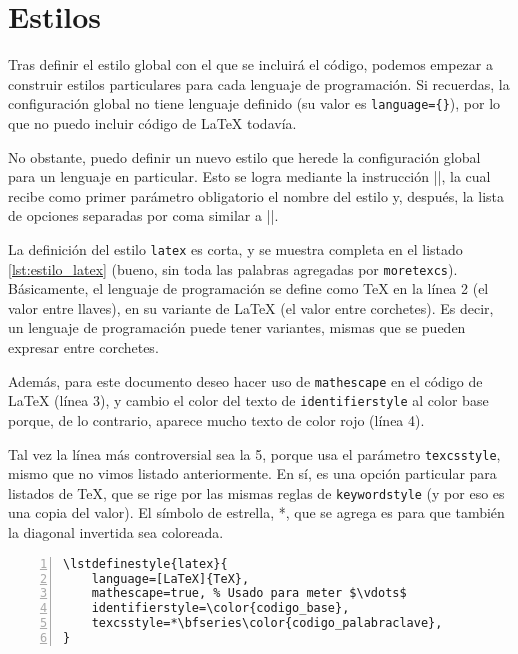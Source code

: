 \section{Estilos}
\label{sec:estilos_listing}



Tras definir el estilo global con el que se incluirá el código, podemos empezar a construir estilos particulares para cada lenguaje de programación. Si recuerdas, la configuración global no tiene lenguaje definido (su valor es \texttt{language=\{\}}), por lo que no puedo incluir código de \LaTeX{} todavía.

No obstante, puedo definir un nuevo estilo que herede la configuración global para un lenguaje en particular. Esto se logra mediante la instrucción |\lstdefinestyle|, la cual recibe como primer parámetro obligatorio el nombre del estilo y, después, la lista de opciones separadas por coma similar a |\lstset|.

La definición del estilo \texttt{latex} es corta, y se muestra completa en el listado \ref{lst:estilo_latex} (bueno, sin toda las palabras agregadas por \texttt{moretexcs}). Básicamente, el lenguaje de programación se define como \TeX{} en la línea 2 (el valor entre llaves), en su variante de \LaTeX{} (el valor entre corchetes). Es decir, un lenguaje de programación puede tener variantes, mismas que se pueden expresar entre corchetes.

Además, para este documento deseo hacer uso de \texttt{mathescape} en el código de \LaTeX{} (línea 3), y cambio el color del texto de \texttt{identifierstyle} al color base porque, de lo contrario, aparece mucho texto de color rojo (línea 4).

Tal vez la línea más controversial sea la 5, porque usa el parámetro \texttt{texcsstyle}, mismo que no vimos listado anteriormente. En sí, es una opción particular para listados de \TeX{}, que se rige por las mismas reglas de \texttt{keywordstyle} (y por eso es una copia del valor). El símbolo de estrella, *, que se agrega es para que también la diagonal invertida sea coloreada.

\begin{lstlisting}[style=latex,numbers=left,mathescape=false,label=lst:estilo_latex,caption={Estilo para lenguaje de programación \LaTeX{}.}]
\lstdefinestyle{latex}{
    language=[LaTeX]{TeX},
    mathescape=true, % Usado para meter $\vdots$
    identifierstyle=\color{codigo_base},
    texcsstyle=*\bfseries\color{codigo_palabraclave},
}
\end{lstlisting}

